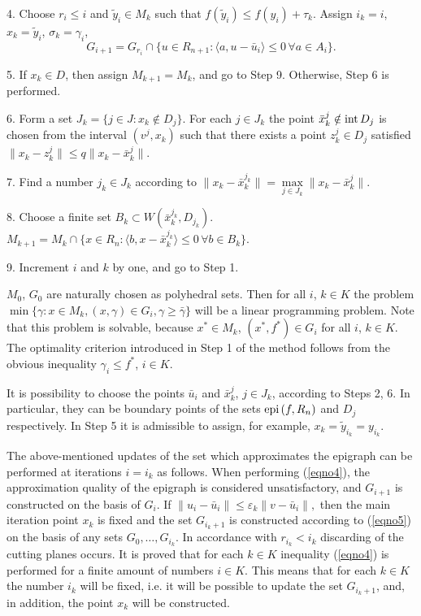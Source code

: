 \documentclass[12pt]{llncs}
\begin{document}
4. Choose $r_i\le i$ and $\tilde{y}_i\in M_k$ such that 
$f(\tilde{y}_i)\le f(y_i) + \tau_k$.
Assign $i_k=i$, $x_k=\tilde{y}_i$, $\sigma_k=\gamma_i$,
\begin{equation}\label{eqno5}
G_{i+1} = G_{r_i} \cap \{ u\in R_{n+1} : \langle a, u - \bar{u}_i\rangle \le 0 \, \forall a \in A_i\}.
\end{equation}

5. If $x_k \in D$, then assign $M_{k+1} = M_k$, and go to Step 9. Otherwise, Step 6 is performed.

6. Form a set
$J_k = \{ j \in J : x_k \notin D_j\}$.
For each $j\in J_k$ the point $\bar{x}_k^j \notin {\rm int\,} D_j$ is chosen from the interval $(v^j, x_k)$ such that there exists a point $z_k^j\in D_j$ satisfied
$\|x_k - z_k^j\|\le q \|x_k - \bar{x}_k^j\|$.

7. Find a number $j_k \in J_k$ according to 
$\| x_k - \bar{x}_k^{j_k}\|=\max \limits_{j\in J_k} \| x_k - \bar{x}_k^j\|.$

8. Choose a finite set 
$B_k \subset W(\bar{x}_k^{j_k}, D_{j_k})$.
$M_{k+1} = M_k \cap \{ x\in R_n : \langle b, x - \bar{x}_k^{j_k}\rangle \le 0 \, \forall b \in B_k\}$.

9. Increment $i$ and $k$ by one, and go to Step 1.

$M_0$, $G_0$ are naturally chosen as polyhedral sets. Then for all $i$, $k\in K$ the problem 
$\min \{ \gamma : x\in M_k, (x, \gamma)\in G_i, \gamma \ge \bar{\gamma}\}$ will be a linear programming problem. Note that this problem is solvable, because $x^*\in M_k$, $(x^*, f^*)\in G_i$ for all $i$, $k\in K$. The optimality criterion introduced in Step 1 of the method follows from the obvious inequality $\gamma_i\le f^*$, $i\in K$.

It is possibility to choose the points $\bar{u}_i$  and $\bar{x}_k^j$, $j \in J_k$, according to Steps 2, 6. In particular, they can be boundary points of the sets ${\rm epi}\, (f, R_n)$ and $D_j$ respectively. In Step 5 it is admissible  to assign, for example,  $x_k=\tilde{y}_{i_k}=y_{i_k}$.

The above-mentioned updates of the set which approximates the epigraph can be performed at iterations $i = i_k$ as follows. When performing (\ref{eqno4}), the approximation quality of the epigraph is considered unsatisfactory, and $G_{i + 1}$ is constructed on the basis of $G_i$.
If 
$\|u_i - \bar{u}_i \| \le \varepsilon_k \| v - \bar{u}_i\|,$
then the main iteration point $x_k$ is fixed and the set $G_{i_k+1}$ is constructed according to (\ref{eqno5}) on the basis of any sets $G_0, \dots, G_{i_k}$. In accordance with $r_{i_k} < i_k$ discarding of the cutting planes occurs. It is proved that for each $k\in K$ inequality (\ref{eqno4}) is performed  for a finite amount of numbers $i\in K$. This means that for each $k\in K$ the number $i_k$ will be fixed, i.e. it will be possible to update the set $G_{i_k+1}$, and, in addition, the point $x_k$ will be constructed.
\end{document}
